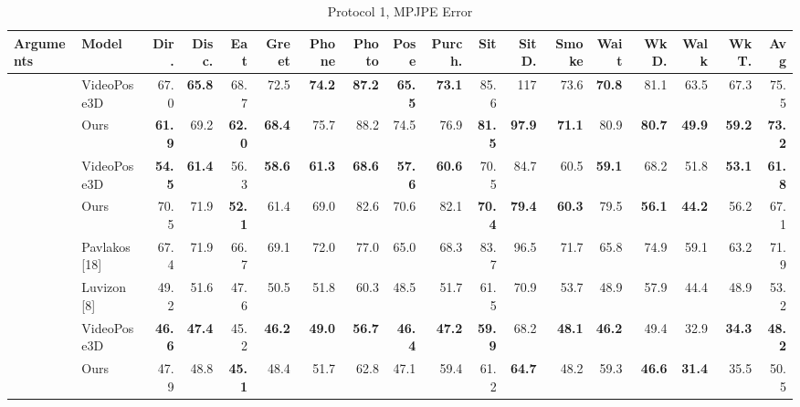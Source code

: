 \documentclass[10pt,twocolumn,letterpaper]{article}
\begin{document}
\begin{center}
\begin{table}
\small
\setlength\tabcolsep{2.3pt}
\begin{tabular}{l|l|rrrrrrrrrrrrrrrr}
\hline
Arguments & Model & Dir. & Disc. & Eat & Greet & Phone & Photo & Pose & Purch. & Sit & SitD. & Smoke & Wait & WkD. & Walk & WkT. & \textbf{Avg} \\

\hline
 & VideoPose3D & 67.0 & \textbf{65.8} & 68.7 & 72.5 & \textbf{74.2} & \textbf{87.2} & \textbf{65.5} & \textbf{73.1} & 85.6 & 117 & 73.6 & \textbf{70.8} & 81.1 & 63.5 & 67.3 & 75.5 \\
 & Ours & \textbf{61.9} & 69.2 & \textbf{62.0} & \textbf{68.4} & 75.7 & 88.2 & 74.5 & 76.9 & \textbf{81.5} & \textbf{97.9} & \textbf{71.1} & 80.9 & \textbf{80.7} & \textbf{49.9} & \textbf{59.2} & \textbf{73.2}\\

\hline


 & VideoPose3D & \textbf{54.5} & \textbf{61.4} & 56.3 & \textbf{58.6} & \textbf{61.3} & \textbf{68.6} & \textbf{57.6} & \textbf{60.6} & 70.5 & 84.7 & 60.5 & \textbf{59.1} & 68.2 & 51.8 & \textbf{53.1} & \textbf{61.8} \\
 & Ours & 70.5 & 71.9 & \textbf{52.1} & 61.4 & 69.0 & 82.6 & 70.6 & 82.1 & \textbf{70.4} & \textbf{79.4} & \textbf{60.3} & 79.5 & \textbf{56.1} & \textbf{44.2} & 56.2 & 67.1\\
\hline

& Pavlakos [18] & 67.4 & 71.9 & 66.7 & 69.1 & 72.0 & 77.0 & 65.0 & 68.3 & 83.7 & 96.5 & 71.7 & 65.8 & 74.9 & 59.1 & 63.2 & 71.9 \\
& Luvizon [8] & 49.2 & 51.6 & 47.6 & 50.5 & 51.8 & 60.3 & 48.5 & 51.7 & 61.5 & 70.9 & 53.7 & 48.9 & 57.9 & 44.4 & 48.9 & 53.2\\
 & VideoPose3D & \textbf{46.6} & \textbf{47.4} & 45.2 & \textbf{46.2} & \textbf{49.0} & \textbf{56.7} & \textbf{46.4} & \textbf{47.2} & \textbf{59.9} & 68.2 & \textbf{48.1} & \textbf{46.2} & 49.4 & 32.9 & \textbf{34.3} & \textbf{48.2}\\
& Ours & 47.9 & 48.8 & \textbf{45.1} & 48.4 & 51.7 & 62.8 & 47.1 & 59.4 & 61.2 & \textbf{64.7} & 48.2 & 59.3 & \textbf{46.6} & \textbf{31.4} & 35.5 & 50.5\\
 
\hline 

\hline
\end{tabular}

\caption{Protocol 1, MPJPE Error}
\label{tab:MPJPE Error}
\end{table}
\end{center}
\end{document}
